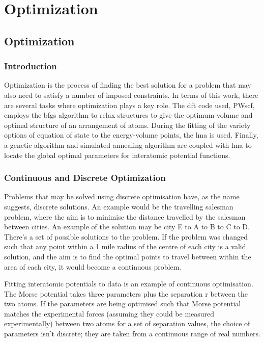 \chapter{Optimization}
\label{chapter:optimization}

\FloatBarrier
\section{Optimization}

\subsection{Introduction}

Optimization is the process of finding the best solution for a problem that may also need to satisfy a number of imposed constraints.  In terms of this work, there are several tasks where optimization plays a key role.  The \acrshort{dft} code used, PWscf, employs the \acrlong{bfgs} algorithm to relax structures to give the optimum volume and optimal structure of an arrangement of atoms.  During the fitting of the variety options of equation of state to the energy-volume points, the \acrlong{lma} is used.  Finally, a genetic algorithm and simulated annealing algorithm are coupled with \acrshort{lma} to locate the global optimal parameters for interatomic potential functions.


\subsection{Continuous and Discrete Optimization}

Problems that may be solved using discrete optimisation have, as the name suggests, discrete solutions.  An example would be the travelling salesman problem, where the aim is to minimise the distance travelled by the salesman between cities.  An example of the solution may be city E to A to B to C to D.  There's a set of possible solutions to the problem.  If the problem was changed such that any point within a 1 mile radius of the centre of each city is a valid solution, and the aim is to find the optimal points to travel between within the area of each city, it would become a continuous problem.

Fitting interatomic potentials to data is an example of continuous optimisation.  The Morse potential takes three parameters plus the separation r between the two atoms.  If the parameters are being optimised such that Morse potential matches the experimental forces (assuming they could be measured experimentally) between two atoms for a set of separation values, the choice of parameters isn't discrete; they are taken from a continuous range of real numbers.



